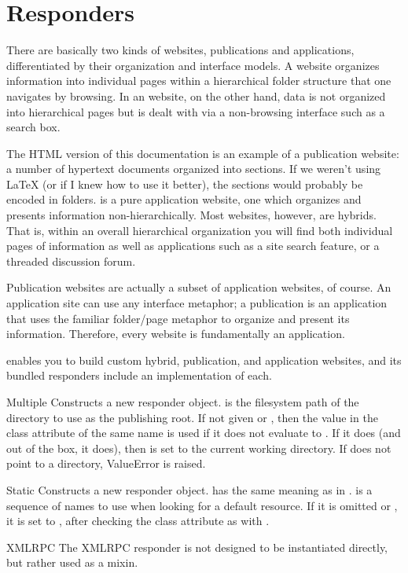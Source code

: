 \section{Responders \label{responders}}

There are basically two kinds of websites, publications and applications,
differentiated by their organization and interface models. A 
website organizes information into individual pages within a hierarchical folder
structure that one navigates by browsing. In an  website, on
the other hand, data is not organized into hierarchical pages but is dealt with
via a non-browsing interface such as a search box.

The HTML version of this documentation is an example of a publication website: a
number of hypertext documents organized into sections. If we weren't using LaTeX
(or if I knew how to use it better), the sections would probably be encoded in
folders.  is a pure application
website, one which organizes and presents information non-hierarchically. Most
websites, however, are hybrids. That is, within an overall hierarchical
organization you will find both individual pages of information as well as
applications such as a site search feature, or a threaded discussion forum.

Publication websites are actually a subset of application websites, of course.
An application site can use any interface metaphor; a publication is an
application that uses the familiar folder/page metaphor to organize and present
its information. Therefore, every website is fundamentally an application.

 enables you to build custom hybrid, publication, and application
websites, and its bundled responders include an implementation of each.




\begin{classdesc}{Multiple}{} Constructs a new 
responder object.  is the filesystem path of the directory to use as
the publishing root. If not given or , then the value in the class
attribute of the same name is used if it does not evaluate to . If
it does (and out of the box, it does), then  is set to the current
working directory. If  does not point to a directory, \exception
{ValueError} is raised.\end{classdesc}

\begin{classdesc}{Static}{} Constructs a new
 responder object.  has the same meaning as in
.  is a sequence of names to use when looking for
a default resource. If it is omitted or , it is set to
, after checking the class attribute as with
. \end{classdesc}

\begin{classdesc*}{XMLRPC}
The XMLRPC responder is not designed to be instantiated directly, but rather
used as a mixin.
\end{classdesc*}






